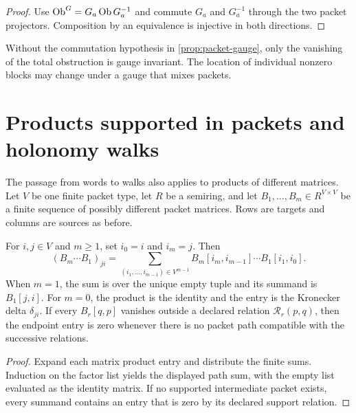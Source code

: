 \begin{proof}
Use $\operatorname{Ob}^G=G_a\operatorname{Ob} G_a^{-1}$ and commute $G_a$ and $G_a^{-1}$ through the
two packet projectors.  Composition by an equivalence is injective in both
directions.
\end{proof}

\begin{boundary}
Without the commutation hypothesis in \cref{prop:packet-gauge}, only the
vanishing of the total obstruction is gauge invariant.  The location of
individual nonzero blocks may change under a gauge that mixes packets.
\end{boundary}

\section{Products supported in packets and holonomy walks}
\label{sec:holonomy-walks}

The passage from words to walks also applies to products of different matrices.
Let $V$
be one finite packet type, let $R$ be a semiring, and let
$B_1,\ldots,B_m\in R^{V\times V}$ be a finite sequence of possibly different
packet matrices.  Rows are targets and columns are sources as before.

\begin{proposition}
\label{prop:heterogeneous-path}
For $i,j\in V$ and $m\geq1$, set $i_0=i$ and $i_m=j$.  Then
\[
\boxed{
(B_m\cdots B_1)_{ji}
=
\sum_{(i_1,\ldots,i_{m-1})\in V^{m-1}}
  B_m[i_m,i_{m-1}]\cdots B_1[i_1,i_0].
}
\]
When $m=1$, the sum is over the unique empty tuple and its summand is
$B_1[j,i]$.
For $m=0$, the product is the identity and the entry is the Kronecker delta
$\delta_{ji}$.  If every $B_r[q,p]$ vanishes outside a declared relation
$\mathcal R_r(p,q)$, then the endpoint entry is zero whenever there is no
packet path compatible with the successive relations.
\end{proposition}

\begin{proof}
Expand each matrix product entry and distribute the finite sums.  Induction on
the factor list yields the displayed path sum, with the empty list evaluated
as the identity matrix.  If no supported intermediate packet exists, every
summand contains an entry that is zero by its declared support relation.
\end{proof}

